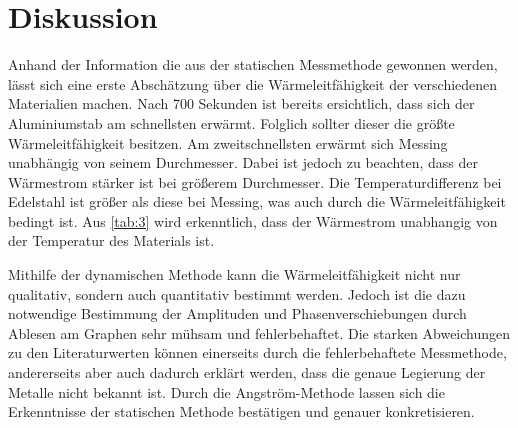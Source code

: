 \section{Diskussion}
\label{sec:Diskussion}
Anhand der Information die aus der statischen Messmethode gewonnen werden, lässt sich eine erste Abschätzung über die Wärmeleitfähigkeit der verschiedenen Materialien machen.
Nach 700 Sekunden ist bereits ersichtlich, dass sich der Aluminiumstab am schnellsten erwärmt.
Folglich sollter dieser die größte Wärmeleitfähigkeit besitzen.
Am zweitschnellsten erwärmt sich Messing unabhängig von seinem Durchmesser.
Dabei ist jedoch zu beachten, dass der Wärmestrom stärker ist bei größerem Durchmesser.
Die Temperaturdifferenz bei Edelstahl ist größer als diese bei Messing, was auch durch die Wärmeleitfähigkeit bedingt ist.
Aus \ref{tab:3} wird erkenntlich, dass der Wärmestrom unabhangig von der Temperatur des Materials ist.

Mithilfe der dynamischen Methode kann die Wärmeleitfähigkeit nicht nur qualitativ, sondern auch quantitativ bestimmt werden.
Jedoch ist die dazu notwendige Bestimmung der Amplituden und Phasenverschiebungen durch Ablesen am Graphen sehr mühsam und fehlerbehaftet.
Die starken Abweichungen zu den Literaturwerten können einerseits durch die fehlerbehaftete 
Messmethode, andererseits aber auch dadurch erklärt werden, dass die genaue Legierung der 
Metalle nicht bekannt ist.
Durch die Angström-Methode lassen sich die Erkenntnisse der statischen Methode bestätigen und genauer konkretisieren.
